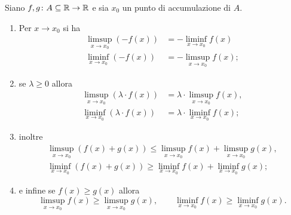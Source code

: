 \begin{theorem}
  Siano $f,g\colon A\subseteq {\mathbb R}\to{\mathbb R}$ e sia $x_0$ un punto di accumulazione di $A$. 
  \begin{enumerate}
    \item 
      Per $x\to x_0$ si ha 
      \begin{align*}
      \limsup_{x\to x_0} (-f(x)) &= -\liminf_{x\to x_0} f(x)\\ 
      \liminf_{x\to x_0} (-f(x)) &= -\limsup_{x\to x_0} f(x);
      \end{align*}
    \item
      se $\lambda \ge 0$ allora
        \begin{align*}
        \limsup_{x\to x_0} (\lambda \cdot f(x)) &= \lambda \cdot \limsup_{x\to x_0} f(x), \\
        \liminf_{x\to x_0} (\lambda \cdot f(x)) &= \lambda \cdot \liminf_{x\to x_0} f(x);
        \end{align*}
    \item
    inoltre
    \begin{gather*}
    \limsup_{x\to x_0} (f(x) + g(x)) \le \limsup_{x\to x_0} f(x) + \limsup_{x\to x_0} g(x),\\
    \liminf_{x\to x_0} (f(x) + g(x)) \ge \liminf_{x\to x_0} f(x) + \liminf_{x\to x_0} g(x);
    \end{gather*}
    \item
    e infine se $f(x) \ge g(x)$ allora
    \[
     \limsup_{x\to x_0} f(x) \ge \limsup_{x\to x_0} g(x), \qquad \liminf_{x\to x_0} f(x) \ge \liminf_{x\to x_0} g(x).
    \]
  \end{enumerate}
\end{theorem}
%
